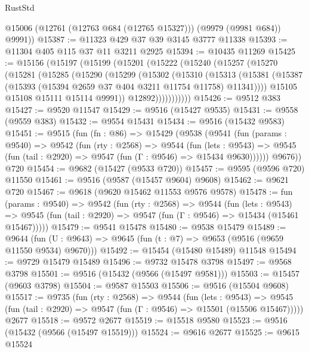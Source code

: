 \begin{lexlean}{RustStd}
\begin{coremodule}
        @15006
        (@12761 (@12763 @684 (@12765 @15327)))
        (@9979 (@9981 @684))
        @9991))
@15387 := @11323 @429 @37 @39 @3145 @3777 @11338
@15393 := @11304 @405 @115 @37 @11 @3211 @2925
@15394 := @10435 @11269
@15425 := @15156
    (@15197
      (@15199
        (@15201
          (@15222
            (@15240
              (@15257
                (@15270
                  (@15281
                    (@15285
                      (@15290
                        (@15299
                          (@15302
                            (@15310
                              (@15313
                                (@15381
                                  (@15387
                                    (@15393 (@15394 @2659 @37 @404 @3211 @11754 @11758) @11341))))
                              @15105
                              @15108
                              @15111
                              @15114
                              @9991))
                          @12892)))))))))))
@15426 := @9512 @383
@15427 := @9520 @11547
@15429 := @9516 (@15427 @9535)
@15431 := @9558 (@9559 @383)
@15432 := @9554 @15431
@15434 := @9516 (@15432 @9583)
@15451 := @9515
    (fun (fn : @86) =>
    @15429
      (@9538
        (@9541
          (fun (params : @9540) =>
          @9542
            (fun (rty : @2568) =>
            @9544
              (fun (lets : @9543) =>
              @9545 (fun (tail : @2920) => @9547 (fun (Γ : @9546) => @15434 @9630))))))
        @9676))
    @720
@15454 := @9682 (@15427 (@9533 @720))
@15457 := @9595 (@9596 @720) @11550
@15461 := @9516 (@9587 (@15457 @9604) @9608)
@15462 := @9621 @720
@15467 := @9618 (@9620 @15462 @11553 @9576 @9578)
@15478 := fun (params : @9540) =>
  @9542
    (fun (rty : @2568) =>
    @9544
      (fun (lets : @9543) =>
      @9545 (fun (tail : @2920) => @9547 (fun (Γ : @9546) => @15434 (@15461 @15467)))))
@15479 := @9541 @15478
@15480 := @9538 @15479
@15489 := @9644
    (fun (U : @9643) => @9645 (fun (t : @7) => @9653 (@9516 (@9659 @11550 @9534) @9670)))
@15492 := @15454 (@15480 @15489) @11548
@15494 := @9729 @15479 @15489
@15496 := @9732 @15478 @3798
@15497 := @9568 @3798
@15501 := @9516 (@15432 (@9566 (@15497 @9581)))
@15503 := @15457 (@9603 @3798)
@15504 := @9587 @15503
@15506 := @9516 (@15504 @9608)
@15517 := @9735
    (fun (rty : @2568) =>
    @9544
      (fun (lets : @9543) =>
      @9545 (fun (tail : @2920) => @9547 (fun (Γ : @9546) => @15501 (@15506 @15467)))))
    @2677
@15518 := @9572 @2677
@15519 := @15518 @9580
@15523 := @9516 (@15432 (@9566 (@15497 @15519)))
@15524 := @9616 @2677
@15525 := @9615 @15524

\end{coremodule}
\end{lexlean}

